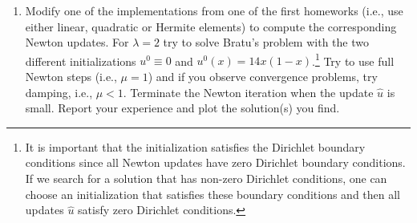 \documentclass[11pt]{article}
\begin{document}
\begin{enumerate}
\begin{enumerate}
{\bf Solution}\\
To find the weak form of the Bratu problem we multiply by a test function $v\in V$ and integrate.
\[
\int_0^1 u''v + \lambda e^u v\ dx = \int_0^1 -u'v' + \lambda e^u v\ dx = 0 
\]
Therefore, we define
\[
G(u,v) := \int_0^1 -u'v' + \lambda e^u v\ dx
\]
for all $u,v \in V$.  Now we compute the directional derivative in a direction $\hat{u} \in V$ by
\begin{align*}
\delta_u G(u,v)(\hat{u}) &= \lim_{\varepsilon \to 0} \frac{1}{\varepsilon} \left\{ \int_0^1 -(u + \varepsilon \hat{u})'v' + \lambda e^{u + \varepsilon \hat{u}}v\ dx  -   \int_0^1 -u'v' + \lambda e^{u}v\ dx \right\}\\
&= \lim_{\varepsilon \to 0} \frac{1}{\varepsilon} \left\{  \int_0^1 -\varepsilon \hat{u}'v' + \lambda e^{u}v \left( e^{\varepsilon \hat{u}} - 1 \right)   \right\}\\
&= \int_0^1 -\hat{u}'v' + \lambda e^u v \hat{u}\ dx
\end{align*}
where the last line follows from the dominated convergence theorem and the fact that 
\[
\lim_{\varepsilon \to 0} \frac{1}{\varepsilon}\left( e^{\varepsilon \hat{u}} - 1 \right) = \hat{u}
\]
for all $x\in (0,1)$.  Thus, the weak form of the Newton update is: given $u^{k} \in V$, find $\hat{u} \in V$ such that 
\[
\int_0^1 -\hat{u}'v' + \lambda e^{u^k} v \hat{u}\ dx = - \int_0^1 -(u^k)'v' + \lambda e^{u^k} v\ dx
\]
for all $v\in V$.  This is now a linear equation for $\hat{u}$ and the right hand side does not depend on $\hat{u}$.\\



\item Modify one of the implementations from one of the first
  homeworks (i.e., use either linear, quadratic or Hermite elements)
  to compute the corresponding Newton updates. For $\lambda=2$ try to
  solve Bratu's problem with the two different initializations
  $u^0\equiv 0$ and $u^0(x) = 14x(1-x)$.\footnote{It is important that
    the initialization satisfies the Dirichlet boundary conditions
    since all Newton updates have zero Dirichlet boundary
    conditions. If we search for a solution that has non-zero
    Dirichlet conditions, one can choose an initialization that
    satisfies these boundary conditions and then all updates $\hat u$
    satisfy zero Dirichlet conditions.} Try to use full Newton steps
  (i.e., $\mu=1$) and if you observe convergence problems, try
  damping, i.e., $\mu<1$. Terminate the Newton iteration when the
  update $\hat u$ is small. Report your experience and plot the
  solution(s) you find.
\end{enumerate}


\end{enumerate}
\end{document}
